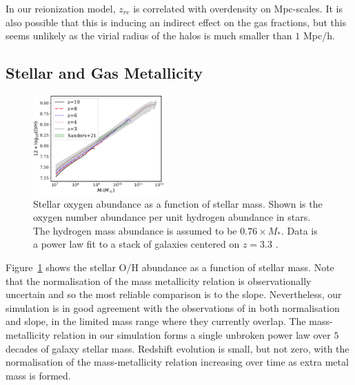 \documentclass[fleqn,usenatbib]{mnras}
\begin{document}
In our reionization model, $z_{re}$ is correlated with overdensity on Mpc-scales. It is also possible that this is inducing an indirect effect on the gas fractions, but this seems unlikely as the virial radius of the halos is much smaller than $1$ Mpc/h.


\subsection{Stellar and Gas Metallicity}

\begin{figure}
\centering
  \includegraphics[width=0.45\textwidth]{plots/starmetal_oh.pdf}
  \caption{Stellar oxygen abundance as a function of stellar mass. Shown is the oxygen number abundance per unit hydrogen abundance in stars. The hydrogen mass abundance is assumed to be $0.76\times M_*$. Data is a power law fit to a stack of galaxies centered on $z=3.3$ \protect\citep{2021ApJ...914...19S}.}
  \label{fig:stellar_metal}
\end{figure}


Figure~\ref{fig:stellar_metal} shows the stellar O/H abundance as a function of stellar mass. Note that the normalisation of the mass metallicity relation is observationally uncertain \citep{2019MNRAS.484.5587T} and so the most reliable comparison is to the slope. Nevertheless, our simulation is in good agreement with the observations of \cite{2021ApJ...914...19S} in both normalisation and slope, in the limited mass range where they currently overlap. The mass-metallicity relation in our simulation forms a single unbroken power law over $5$ decades of galaxy stellar mass. Redshift evolution is small, but not zero, with the normalisation of the mass-metallicity relation increasing over time as extra metal mass is formed.
\end{document}
